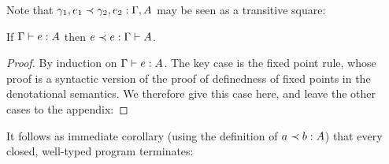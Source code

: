 \noindent
Note that $\oplr{\Gamma,A}{\gamma_1,e_1}{\gamma_2,e_2}$ may be seen as a transitive square:

\begin{center}
  {}
\end{center}

\begin{theorem}
  If $\J e \Gamma A$ then $\oplr{\Gamma \vdash A} e e$.
\end{theorem}
\begin{proof}
  By induction on $\J e \Gamma A$.
%
  The key case is the fixed point rule, whose proof is a syntactic version of
  the proof of definedness of fixed points in the denotational semantics. We
  therefore give this case here, and leave the other cases to the appendix: 
\end{proof}

\noindent
It follows as immediate corollary (using the definition of $\oplrclosed A a b$)
that every closed, well-typed program terminates: 
